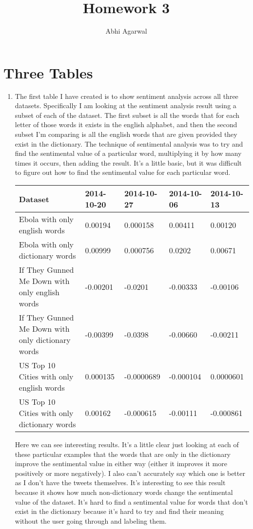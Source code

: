 \documentclass[11pt, oneside]{article}
\title{Homework 3}
\author{Abhi Agarwal}
\date{}
\begin{document}
\maketitle

\section*{Three Tables}
\begin{enumerate}
\item The first table I have created is to show sentiment analysis across all three datasets. Specifically I am looking at the sentiment analysis result using a subset of each of the dataset. The first subset is all the words that for each letter of those words it exists in the english alphabet, and then the second subset I'm comparing is all the english words that are given provided they exist in the dictionary. The technique of sentimental analysis was to try and find the sentimental value of a particular word, multiplying it by how many times it occurs, then adding the result. It's a little basic, but it was difficult to figure out how to find the sentimental value for each particular word.

\begin{tabularx}{\textwidth}{X|l|l|l|l}
\textbf{Dataset} & \textbf{2014-10-20} & \textbf{2014-10-27} & \textbf{2014-10-06} & \textbf{2014-10-13} \\
\hline Ebola with only english words & 0.00194 & 0.000158 & 0.00411 & 0.00120 \\ 
\hline Ebola with only dictionary words & 0.00999 & 0.000756 & 0.0202 & 0.00671 \\ 
\hline If They Gunned Me Down with only english words & -0.00201 & -0.0201 & -0.00333 & -0.00106 \\ 
\hline If They Gunned Me Down with only dictionary words & -0.00399 & -0.0398 & -0.00660 & -0.00211 \\ 
\hline US Top 10 Cities with only english words & 0.000135 & -0.0000689 & -0.000104 & 0.0000601 \\ 
\hline US Top 10 Cities with only dictionary words & 0.00162 & -0.000615 & -0.00111 & -0.000861 \\ 
\hline \end{tabularx}

\par Here we can see interesting results. It's a little clear just looking at each of these particular examples that the words that are only in the dictionary improve the sentimental value in either way (either it improves it more positively or more negatively). I also can't accurately say which one is better as I don't have the tweets themselves. It's interesting to see this result because it shows how much non-dictionary words change the sentimental value of the dataset. It's hard to find a sentimental value for words that don't exist in the dictionary because it's hard to try and find their meaning without the user going through and labeling them.


\end{enumerate}
\end{document}
